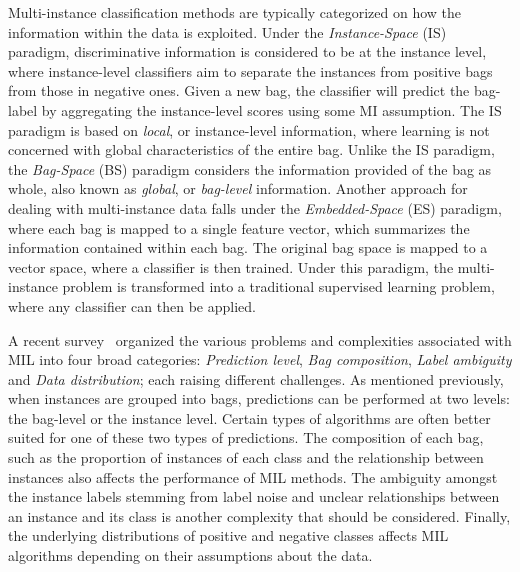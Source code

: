 \documentclass[reqno]{vcuthesis}
\numberwithin{equation}{chapter}
\begin{document}
Multi-instance classification methods are typically categorized on how the information within the data is exploited. Under the \textit{Instance-Space} (IS) paradigm, discriminative information is considered to be at the instance level, where instance-level classifiers aim to separate the instances from positive bags from those in negative ones. Given a new bag, the classifier will predict the bag-label by aggregating the instance-level scores using some MI assumption. The IS paradigm is based on \textit{local}, or instance-level information, where learning is not concerned with global characteristics of the entire bag. Unlike the IS paradigm, the \textit{Bag-Space} (BS) paradigm considers the information provided of the bag as whole, also known as \textit{global}, or \textit{bag-level} information. Another approach for dealing with multi-instance data falls under the \textit{Embedded-Space} (ES) paradigm, where each bag is mapped to a single feature vector, which summarizes the information contained within each bag. The original bag space is mapped to a vector space, where a classifier is then trained. Under this paradigm, the multi-instance problem is transformed into a traditional supervised learning problem, where any classifier can then be applied.

A recent survey~\cite{carbonneau2018multiple} organized the various problems and complexities associated with MIL into four broad categories: \textit{Prediction level}, \textit{Bag composition}, \textit{Label ambiguity} and \textit{Data distribution}; each raising different challenges. As mentioned previously, when instances are grouped into bags, predictions can be performed at two levels: the bag-level or the instance level. Certain types of algorithms are often better suited for one of these two types of predictions. The composition of each bag, such as the proportion of instances of each class and the relationship between instances also affects the performance of MIL methods. The ambiguity amongst the instance labels stemming from label noise and unclear relationships between an instance and its class is another complexity that should be considered. Finally, the underlying distributions of positive and negative classes affects MIL algorithms depending on their assumptions about the data.
\end{document}
